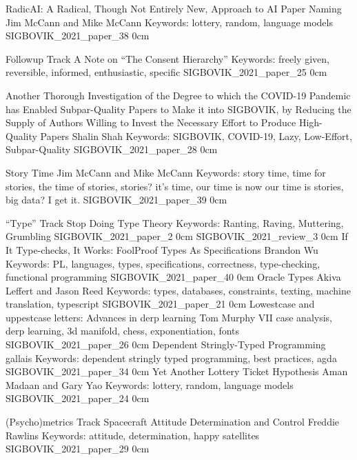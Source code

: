 \addpaper
    {RadicAI: A Radical, Though Not Entirely New, Approach to AI Paper Naming}
    {Jim McCann and Mike McCann}
    {Keywords: lottery, random, language models}
    {SIGBOVIK_2021_paper_38}
    {0cm}
    {}

\addtrack
    {}{Followup Track}
\addpaper
    {A Note on ``The Consent Hierarchy''}
    {}
    {Keywords: freely given, reversible, informed, enthusiastic, specific}
    {SIGBOVIK_2021_paper_25}
    {0cm}
    {}

\addpaper
    {Another Thorough Investigation of the Degree to which the COVID-19 Pandemic has Enabled Subpar-Quality Papers to Make it into SIGBOVIK, by Reducing the Supply of Authors Willing to Invest the Necessary Effort to Produce High-Quality Papers}
    {Shalin Shah}
    {Keywords: SIGBOVIK, COVID-19, Lazy, Low-Effort, Subpar-Quality}
    {SIGBOVIK_2021_paper_28}
    {0cm}
    {}

\addpaper
    {Story Time}
    {Jim McCann and Mike McCann}
    {Keywords: story time, time for stories, the time of stories, stories? it's time, our time is now our time is stories, big data? I get it.}
    {SIGBOVIK_2021_paper_39}
    {0cm}
    {}

\addtrack
    {}{``Type'' Track}
\addpaper
    {Stop Doing Type Theory}
    {}
    {Keywords: Ranting, Raving, Muttering, Grumbling}
    {SIGBOVIK_2021_paper_2}
    {0cm}
    {}
\addreview
    {SIGBOVIK_2021_review_3}
    {0cm}
\addpaper
    {If It Type-checks, It Works: FoolProof Types As Specifications}
    {Brandon Wu}
    {Keywords: PL, languages, types, specifications, correctness, type-checking, functional programming}
    {SIGBOVIK_2021_paper_40}
    {0cm}
    {}
\addpaper
    {Oracle Types}
    {Akiva Leffert and Jason Reed}
    {Keywords: types, databases, constraints, texting, machine translation, typescript}
    {SIGBOVIK_2021_paper_21}
    {0cm}
    {}
\addpaper
    {Lowestcase and uppestcase letters: Advances in derp learning}
    {Tom Murphy VII}
    {case analysis, derp learning, 3d manifold, chess, exponentiation, fonts}
    {SIGBOVIK_2021_paper_26}
    {0cm}
    {}
\addpaper
    {Dependent Stringly-Typed Programming}
    {gallais}
    {Keywords: dependent stringly typed programming, best practices, agda}
    {SIGBOVIK_2021_paper_34}
    {0cm}
    {}
\addpaper
    {Yet Another Lottery Ticket Hypothesis}
    {Aman Madaan and Gary Yao}
    {Keywords: lottery, random, language models}
    {SIGBOVIK_2021_paper_24}
    {0cm}
    {}

\addtrack
    {}{(Psycho)metrics Track}
\addpaper
    {Spacecraft Attitude Determination and Control}
    {Freddie Rawlins}
    {Keywords: attitude, determination, happy satellites}
    {SIGBOVIK_2021_paper_29}
    {0cm}
    {}

